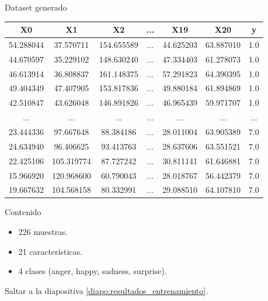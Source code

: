 \documentclass{beamer}
\begin{document}
\begin{frame}{Dataset generado}
\label{diapo:dataset_generado}
\begin{table}
\begin{center}
\begin{adjustbox}{max width=250}
\begin{tabular}{|c|c|c|c|c|c|c|}
     \hline
    \textbf{X0} & \textbf{X1} & \textbf{X2} & \textbf{...} & \textbf{X19} & \textbf{X20} & \textbf{y}\\
    \hline
    54.288044 & 37.570711 & 154.655589 & ... & 44.625203 & 63.887010 & 1.0\\ 
    44.670597 & 35.229102 & 148.630240 & ... & 47.334403 & 61.278073 & 1.0\\
    46.613914 & 36.808837 & 161.148375 & ... & 57.291823 & 64.390395 & 1.0\\
    49.404349 & 47.407905 & 153.817836 & ... & 49.880184 & 61.894869 & 1.0\\
    42.510847 & 43.626048 & 146.891826 & ... & 46.965439 & 59.971707 & 1.0\\
    ... & ... & ... & ... & ... & ... & ...\\
    23.444336 & 97.667648 & 88.384186 & ... & 28.011004 & 63.905389 & 7.0\\
    24.634940 & 96.406625 & 93.413763 & ... & 28.637606 & 63.551521 & 7.0\\
    22.425106 & 105.319774 & 87.727242 & ... & 30.811141 & 61.646881 & 7.0\\
    15.966920 & 120.968600 & 60.790043 & ... & 28.018767 & 56.442379 & 7.0\\
    19.667632 & 104.568158 & 80.332991 & ... & 29.088510 & 64.107810 & 7.0\\
     \hline
 \end{tabular}
 \end{adjustbox}
\end{center}
\end{table}
\begin{block}{Contenido}
\begin{itemize}
    \item 226 muestras.
    \item 21 características.
    \item 4 clases (anger, happy, sadness, surprise).
\end{itemize}
\end{block}

Saltar a la diapositiva \ref{diapo:resultados_entrenamiento}.

\end{frame}
\end{document}

